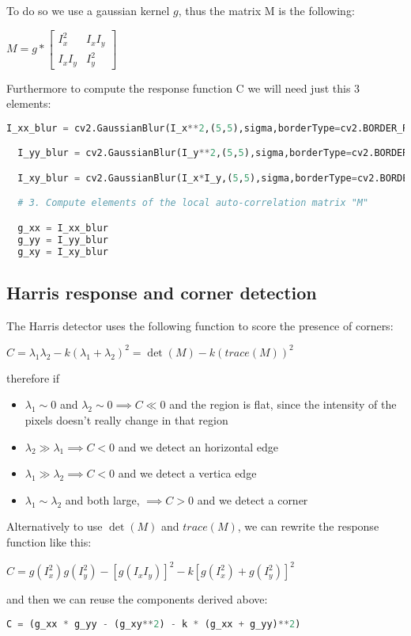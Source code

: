 \documentclass{ETHExercise}
\begin{document}
To do so we use a gaussian kernel $g$, thus the matrix M is 
the following:
\begin{center}
  $M = g * \begin{bmatrix}
    I_x^2 & I_xI_y\\
    I_xI_y & I_y^2
  \end{bmatrix}$
\end{center}

Furthermore to compute the response function C we will need just this 3 elements:
\begin{lstlisting}[language=Python, caption=Local auto-correlation matrix elements]
  I_xx_blur = cv2.GaussianBlur(I_x**2,(5,5),sigma,borderType=cv2.BORDER_REPLICATE)

  I_yy_blur = cv2.GaussianBlur(I_y**2,(5,5),sigma,borderType=cv2.BORDER_REPLICATE)

  I_xy_blur = cv2.GaussianBlur(I_x*I_y,(5,5),sigma,borderType=cv2.BORDER_REPLICATE)

  # 3. Compute elements of the local auto-correlation matrix "M"

  g_xx = I_xx_blur
  g_yy = I_yy_blur
  g_xy = I_xy_blur
\end{lstlisting}

\subsection{Harris response and corner detection}
The Harris detector uses the following function to score
the presence of corners:
\begin{center}
  $C = \lambda_1 \lambda_2 - k (\lambda_1 + \lambda_2)^2 = \det(M) - k (trace(M))^2$
\end{center}
therefore if
\begin{itemize}
  \item $\lambda_1 \sim 0$ and $\lambda_2 \sim 0 \implies C \ll 0$ and the region is flat,
   since the intensity of the pixels doesn't really change in that region
  \item $\lambda_2 \gg \lambda_1 \implies C < 0$ and we detect an horizontal edge
  \item $\lambda_1 \gg \lambda_2 \implies C < 0$ and we detect a vertica edge
  \item $\lambda_1 \sim \lambda_2$ and both large, $\implies C > 0$ and we detect a corner
\end{itemize}
Alternatively to use $\det(M)$ and $trace(M)$, we can rewrite the response function like this:
\begin{center}
  $C = g(I_x^2)g(I_y^2)- [g(I_x I_y)]^2 - k[ g(I_x^2)+g(I_y^2)]^2$
\end{center}
and then we can reuse the components derived above:
\begin{lstlisting}[language=Python, caption=Harris response function]
  C = (g_xx * g_yy - (g_xy**2) - k * (g_xx + g_yy)**2)
\end{lstlisting}
\end{document}
